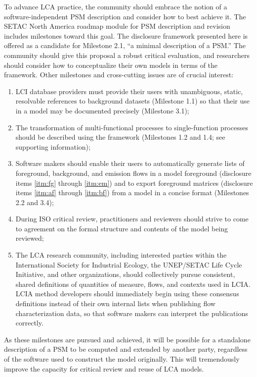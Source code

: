To advance LCA practice, the community should embrace the notion of a software-independent PSM description and consider how to best achieve it.  The SETAC North America roadmap module for PSM description and revision \citep{Kuczenski_JLCA_2018} includes milestones toward this goal.  The disclosure framework presented here is offered as a candidate for Milestone 2.1, ``a minimal description of a PSM.''  The community should give this proposal a robust critical evaluation, and researchers should consider how to conceptualize their own models in terms of the framework.  Other milestones and cross-cutting issues are of crucial interest:
\begin{enumerate}[label=(\alph*)]
\item LCI database providers must provide their users with unambiguous, static, resolvable references to background datasets (Milestone 1.1) so that their use in a model may be documented precisely (Milestone 3.1);
\item The transformation of multi-functional processes to single-function processes should be described using the framework (Milestones 1.2 and 1.4; see supporting information);
\item Software makers should enable their users to automatically generate lists of foreground, background, and emission flows in a model foreground (disclosure items \ref{itm:fg} through \ref{itm:em}) and to export foreground matrices (disclosure items \ref{itm:af} through \ref{itm:bf}) from a model in a concise format (Milestones 2.2 and 3.4);
\item During ISO critical review, practitioners and reviewers should strive to come to agreement on the formal structure and contents of the model being reviewed;
\item The LCA research community, including interested parties within the International Society for Industrial Ecology, the UNEP/SETAC Life Cycle Initiative, and other organizations, should collectively pursue consistent, shared definitions of quantities of measure, flows, and contexts used in LCIA.  %
LCIA method developers should immediately begin using these consensus definitions instead of their own internal lists when publishing flow characterization data, so that software makers can interpret the publications correctly.  %
\end{enumerate}
As these milestones are pursued and achieved, it will be possible for a standalone description of a PSM to be computed and extended by another party, regardless of the software used to construct the model originally.  This will tremendously improve the capacity for critical review and reuse of LCA models.

